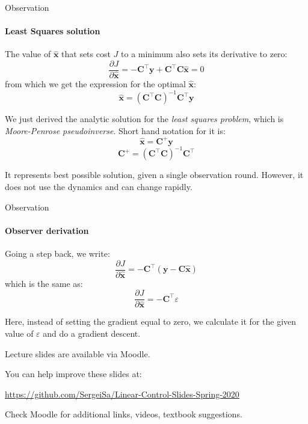 \documentclass{beamer}
\begin{document}
\begin{frame}{Observation}
\framesubtitle{Least Squares solution}
\begin{flushleft}

The value of $\hat{\mathbf x}$ that sets cost $J$ to a minimum also sets its derivative to zero:
%
\[
\frac{\partial J}{\partial \hat{\mathbf x}} = 
-\mathbf C^\top \mathbf y + 
\mathbf C^\top \mathbf C \hat{\mathbf x} = 0
\]
%
from which we get the expression for the optimal $\hat{\mathbf x}$:
%
\[
 \hat{\mathbf x} = (\mathbf C^\top \mathbf C)^{-1} \mathbf C^\top \mathbf y
\]

We just derived the analytic solution for the \emph{least squares problem}, which is \emph{Moore-Penrose pseudoinverse}. Short hand notation for it is:
%
\[
 \hat{\mathbf x} = \mathbf C^+ \mathbf y
\]
\[
\mathbf C^+ =  (\mathbf C^\top \mathbf C)^{-1} \mathbf C^\top
\]

It represents best possible solution, given a single observation round. However, it does not use the dynamics and can change rapidly.


\end{flushleft}
\end{frame}

\begin{frame}{Observation}
\framesubtitle{Observer derivation}
\begin{flushleft}

Going a step back, we write:
%
\[
\frac{\partial J}{\partial \hat{\mathbf x}} = 
-\mathbf C^\top (\mathbf y - 
\mathbf C \hat{\mathbf x})
\]
%
which is the same as:
%
\[
\frac{\partial J}{\partial \hat{\mathbf x}} = -\mathbf C^\top \varepsilon
\]

Here, instead of setting the gradient equal to zero, we calculate it for the given value of $\varepsilon$ and do a gradient descent.

\end{flushleft}
\end{frame}


\begin{frame}
\centerline{Lecture slides are available via Moodle.}
\bigskip
\centerline{You can help improve these slides at:}
\centerline{\url{https://github.com/SergeiSa/Linear-Control-Slides-Spring-2020}}
\bigskip
\centerline{Check Moodle for additional links, videos, textbook suggestions.}
\end{frame}
\end{document}

